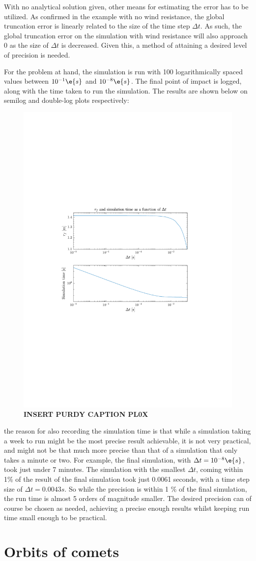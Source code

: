 \documentclass[a4paper,10pt]{article} 	%
\numberwithin{equation}{section}
\begin{document}
 	With no analytical solution given, other means for estimating the error has to be utilized. As confirmed in the example with no wind resistance, the global truncation error is linearly related to the size of the time step $ \Delta t $. As such, the global truncation error on the simulation with wind resistance will also approach 0 as the size of $ \Delta t $ is decreased. Given this, a method of attaining a desired level of precision is needed.
 	
 	For the problem at hand, the simulation is run with 100 logarithmically spaced values between $ 10^{-1} \e{s}$ and $ 10^{-8} \e{s} $. The final point of impact is logged, along with the time taken to run the simulation. The results are shown below on semilog and double-log plots respectively:
 	\begin{figure}[H]
 		\centering
 		\includegraphics[width = 0.7\linewidth]{simtime.pdf}
 		\caption{\textbf{INSERT PURDY CAPTION PL0X}}
 		\label{fig:simtime}
 	\end{figure}
 	the reason for also recording the simulation time is that while a simulation taking a week to run might be the most precise result achievable, it is not very practical, and might not be that much more precise than that of a simulation that only takes a minute or two. For example, the final simulation, with $ \Delta t = 10^{-8} \e{s} $, took just under 7 minutes. The simulation with the smallest $ \Delta t $, coming within 1\% of the result of the final simulation took just 0.0061 seconds, with a time step size of $ \Delta t = 0.0043 s $. So while the precision is within 1 \% of the final simulation, the run time is almost 5 orders of magnitude smaller. The desired precision can of course be chosen as needed, achieving a precise enough results whilst keeping run time small enough to be practical.
 	
 	
 	\section{Orbits of comets}
 	
 	
	
	
\end{document}
